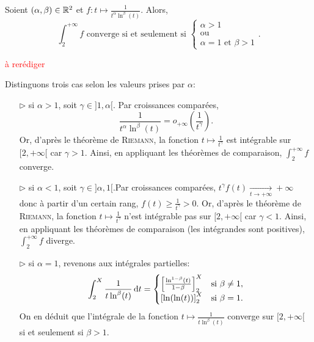 \begin{prop}
    Soient $(\alpha, \beta) \in  \mathbb{R}^2$ et $f:t \mapsto \frac{1}{t^{\alpha} \ln^{\beta} (t)}$. Alors,
    $$\int_{2}^{+ \infty} f \text{ converge si et seulement si }
    \begin{cases}
    \alpha > 1 \\
    \text{ou}\\
    \alpha = 1 \text{ et } \beta > 1
    \end{cases}.
    $$
\end{prop}

\textcolor{red}{à rerédiger}
\begin{preuve}
    Distinguons trois cas selon les valeurs prises par $\alpha$:
    \begin{enumerate}
        \item[$\rhd$] si $\alpha > 1$, soit $\gamma \in ]1, \alpha[$. Par croissances comparées,
        $$\displaystyle \frac{1}{t^{\alpha} \ln^{\beta} (t)} = o_{+ \infty} \left( \frac{1}{t^{\gamma}} \right).$$
        Or, d'après le théorème de \textsc{Riemann}, la fonction $t \mapsto \frac{1}{t^\gamma}$ est intégrable sur $[2, +\infty[$ car $\gamma > 1$. Ainsi, en appliquant les théorèmes de comparaison, $\int_2^{+ \infty} f$ converge.
        \item[$\rhd$] si $\alpha < 1$, soit $\gamma \in ]\alpha, 1[$.Par croissances comparées,
        $t^{\gamma} f(t) \xrightarrow[t \to + \infty]{} + \infty$
        donc à partir d'un certain rang, $f(t) \geqslant \frac{1}{t^{\gamma}} > 0$. Or, d'après le théorème de \textsc{Riemann}, la fonction $t \mapsto \frac{1}{t^\gamma}$ n'est intégrable pas sur $[2, +\infty[$ car $\gamma < 1$. Ainsi, en appliquant les théorèmes de comparaison (les intégrandes sont positives), $\int_2^{+ \infty} f$ diverge.
        \item[$\rhd$] si $\alpha = 1$, revenons aux intégrales partielles:
        $$\int_{2}^{X} \frac{1}{t \ln^{\beta} (t)} \, \mathrm{d} t = 
        \begin{cases}
            \left[ \frac{\ln ^{1-\beta} (t)}{1-\beta} \right]_2 ^X & \text{si } \beta \not = 1, \\
            \left[\ln (\ln(t)) \right]_2 ^X & \text{si } \beta = 1.
        \end{cases}
        $$
        On en déduit que l'intégrale de la fonction $t \mapsto \frac{1}{t \ln^{\beta} (t)}$ converge sur $[2, + \infty[$ si et seulement si $\beta > 1$.
    \end{enumerate}
\end{preuve}
